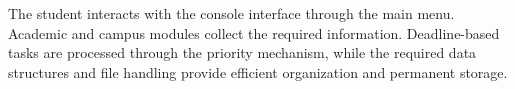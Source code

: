 \documentclass[11pt,a4paper]{article}
\newenvironment{sectionblock}
{%
    \par
    \needspace{8\baselineskip}
}
{%
    \par
}
\begin{document}
\begin{sectionblock}
{\begin{center}
{%
}

\vspace{4mm}

The student interacts with the console interface through the main menu. Academic and campus modules collect the required information. Deadline-based tasks are processed through the priority mechanism, while the required data structures and file handling provide efficient organization and permanent storage.

\end{center}

}

\end{sectionblock}

\newpage

\end{document}

